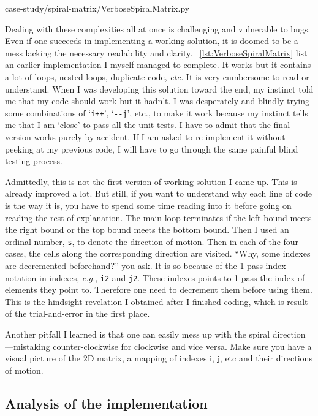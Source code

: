 \documentclass[oneside,11pt]{book}
\theoremstyle{definition}
\theoremstyle{remark}
\newcommand{\code}[1]{\mbox{\lstinline{#1}}}
\newcommand{\java}{Java }
\begin{document}
\begin{clisting}
    
    {case-study/spiral-matrix/VerboseSpiralMatrix.py}
\end{clisting}\newpage

Dealing with these complexities all at once is challenging and vulnerable to bugs.
Even if one succeeds in implementing a working solution, it is doomed to be a mess lacking the
necessary readability and clarity.
~\autoref{lst:VerboseSpiralMatrix} list an earlier implementation I myself managed to complete.
It works but it contains a lot of loops, nested loops, duplicate code, \textit{etc.}
It is very cumbersome to read or understand.
When I was developing this solution toward the end, my instinct told me that my code should work
but it hadn't.
I was desperately and blindly trying some combinations of `\code{i++}', `\code{--j}', etc., to
make it work
because my instinct tells me that I am `close' to pass all the unit tests.
I have to admit that the final version works purely by accident.
If I am asked to re-implement it without peeking at my previous code, I will have to go
through the same painful blind testing process.


Admittedly, this is not the first version of working solution I came up.
This is already improved a lot.
But still, if you want to understand why each line of code is the way it is, you have to spend some
time reading into it before going on reading the rest of explanation.
The main loop terminates if the left bound meets the right bound or the top bound meets the
bottom bound.
Then I used an ordinal number, \code{s}, to denote the direction of motion.
Then in each of the four cases, the cells along the corresponding direction are visited.
``Why, some indexes are decremented beforehand?'' you ask.
It is so because of the 1-pass-index notation in indexes, \textit{e.g.}, \code{i2} and \code{j2}.
These indexes points to 1-pass the index of elements they point to.
Therefore one need to decrement them before using them.
This is the hindsight revelation I obtained after I finished coding, which is result of the
trial-and-error in the first place.

Another pitfall I learned is that one can easily mess up with the spiral
direction---mistaking counter-clockwise for clockwise and vice versa.
Make sure you have a visual picture of the $2$D matrix, a mapping of indexes i, j, etc and their
directions of motion.

\subsection{Analysis of the implementation}\label{subsec:implement.analysis.spiral-matrix}
\end{document}
